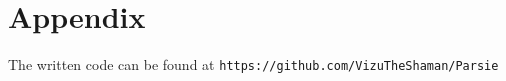 \chapter{Appendix}\label{appendix}
The written code can be found at \texttt{https://github.com/VizuTheShaman/Parsie}
